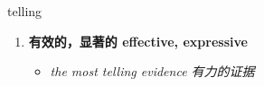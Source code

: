 
\begin{frame}
{\huge telling}
\begin{center}
\begin{enumerate}\Large
  \item \textbf{有效的，显著的 effective, expressive}
  \begin{itemize}
    \item \em{\Large{the most telling evidence 有力的证据}}
  \end{itemize}
\end{enumerate}
\end{center}
\end{frame}
